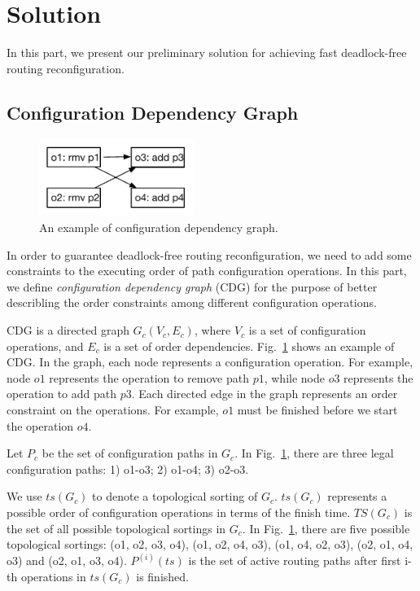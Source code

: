 \section{Solution}\label{sec:solution}

In this part, we present our preliminary solution for achieving fast deadlock-free routing reconfiguration.

\subsection{Configuration Dependency Graph}\label{subsec:cdg}

\begin{figure}[t]
	\centering
	\includegraphics[width=0.45\textwidth] {figs/formulation_example}
	\caption{An example of configuration dependency graph.}\label{fig:cdgraph}
\end{figure}

In order to guarantee deadlock-free routing reconfiguration, we need to add some constraints to the executing order of path configuration operations. In this part, we define \textit{configuration dependency graph} (CDG) for the purpose of better describling the order constraints among different configuration operations.

CDG is a directed graph $G_c(V_c,E_c)$, where $V_c$ is a set of configuration operations, and $E_c$ is a set of order dependencies. Fig.~\ref{fig:cdgraph} shows an example of CDG. In the graph, each node represents a configuration operation. For example, node $o1$ represents the operation to remove path $p1$, while node $o3$ represents the operation to add path $p3$. Each directed edge in the graph represents an order constraint on the operations. For example,  $o1$ must be finished before we start the operation $o4$.

Let $P_c$ be the set of configuration paths in $G_c$. In Fig.~\ref{fig:cdgraph}, there are three legal configuration paths: 1) o1-o3; 2) o1-o4; 3) o2-o3. 

We use $ts(G_c)$ to denote a topological sorting of $G_c$. $ts(G_c)$ represents a possible order of configuration operations in terms of the finish time.  $TS(G_c)$ is the set of all possible topological sortings in $G_c$. In Fig.~\ref{fig:cdgraph}, there are five possible topological sortings: (o1, o2, o3, o4), (o1, o2, o4, o3), (o1, o4, o2, o3), (o2, o1, o4, o3) and (o2, o1, o3, o4). $P^{(i)}(ts)$ is  the set of active routing paths after first i-th operations in $ts(G_c)$ is finished. 

